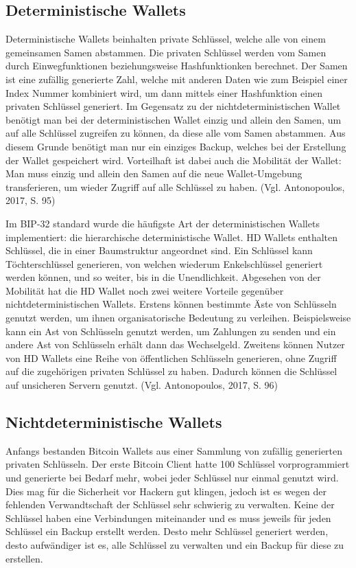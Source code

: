 \subsection{Deterministische Wallets}
Deterministische Wallets beinhalten private Schlüssel, welche alle von einem gemeinsamen Samen abstammen. Die privaten Schlüssel
werden vom Samen durch Einwegfunktionen beziehungsweise Hashfunktionken berechnet. Der Samen ist eine zufällig generierte Zahl,
welche mit anderen Daten wie zum Beispiel einer Index Nummer kombiniert wird, um dann mittels einer Hashfunktion einen privaten
Schlüssel generiert. Im Gegensatz zu der nichtdeterministischen Wallet benötigt man bei der deterministischen Wallet einzig und 
allein den Samen, um auf alle Schlüssel zugreifen zu können, da diese alle vom Samen abstammen. Aus diesem Grunde benötigt man
nur ein einziges Backup, welches bei der Erstellung der Wallet gespeichert wird. Vorteilhaft ist dabei auch die Mobilität der
Wallet: Man muss einzig und allein den Samen auf die neue Wallet-Umgebung transferieren, um wieder Zugriff auf alle Schlüssel
zu haben. (Vgl. Antonopoulos, 2017, S. 95)

Im BIP-32 standard wurde die häufigste Art der deterministischen Wallets implementiert: die hierarchische deterministische Wallet.
HD Wallets enthalten Schlüssel, die in einer Baumstruktur angeordnet sind. Ein Schlüssel kann Töchterschlüssel generieren, von 
welchen wiederum Enkelschlüssel generiert werden können, und so weiter, bis in die Unendlichkeit. Abgesehen von der Mobilität
hat die HD Wallet noch zwei weitere Vorteile gegenüber nichtdeterministischen Wallets. Erstens können bestimmte Äste von
Schlüsseln genutzt werden, um ihnen organisatorische Bedeutung zu verleihen. Beispielsweise kann ein Ast von Schlüsseln genutzt
werden, um Zahlungen zu senden und ein andere Ast von Schlüsseln erhält dann das Wechselgeld. Zweitens können Nutzer von HD
Wallets eine Reihe von öffentlichen Schlüsseln generieren, ohne Zugriff auf die zugehörigen privaten Schlüssel zu haben. Dadurch 
können die Schlüssel auf unsicheren Servern genutzt. (Vgl. Antonopoulos, 2017, S. 96)


\subsection{Nichtdeterministische Wallets}
Anfangs bestanden Bitcoin Wallets aus einer Sammlung von zufällig generierten privaten Schlüsseln. Der erste Bitcoin Client
hatte 100 Schlüssel vorprogrammiert und generierte bei Bedarf mehr, wobei jeder Schlüssel nur einmal genutzt wird. Dies mag
für die Sicherheit vor Hackern gut klingen, jedoch ist es wegen der fehlenden Verwandtschaft der Schlüssel sehr schwierig
zu verwalten. Keine der Schlüssel haben eine Verbindungen miteinander und es muss jeweils für jeden Schlüssel ein Backup
erstellt werden. Desto mehr Schlüssel generiert werden, desto aufwändiger ist es, alle Schlüssel zu verwalten und ein Backup
für diese zu erstellen.


